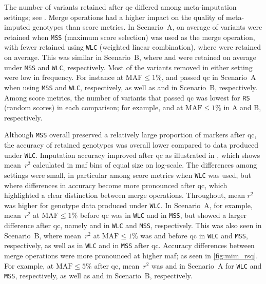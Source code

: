 %

%

The number of variants retained after \gls{qc} differed among meta-imputation settings; see .
Merge operations had a higher impact on the quality of meta-imputed genotypes than score metrics.
In Scenario~A, on average  of variants were retained when \texttt{MSS} (maximum score selection) was used as the merge operation, with fewer retained using \texttt{WLC} (weighted linear combination), where  were retained on average.
This was similar in Scenario~B, where  and 
were retained on average under \texttt{MSS} and \texttt{WLC}, respectively.
Most of the variants removed in either setting were low in frequency.
For instance at ${\text{MAF} \leq 1\%}$,
 and
 passed \gls{qc} in Scenario~A
when using \texttt{MSS} and \texttt{WLC}, respectively, as well as
 and
 in Scenario~B, respectively.
Among score metrics, the number of variants that passed \gls{qc} was lowest for \texttt{RS} (random scores) in each comparison; for example,  and  at ${\text{MAF} \leq 1\%}$ in A and B, respectively.

%

%

Although \texttt{MSS} overall preserved a relatively large proportion of markers after \gls{qc}, the accuracy of retained genotypes was overall lower compared to data produced under \texttt{WLC}.
Imputation accuracy improved after \gls{qc} as illustrated in , which shows mean~$r^2$ calculated in \gls{maf} bins of equal size on log-scale.
The differences among settings were small, in particular among score metrics when \texttt{WLC} was used, but where differences in accuracy become more pronounced after \gls{qc}, which highlighted a clear distinction between merge operations.
Throughout, mean $r^2$ was higher for genotype data produced under \texttt{WLC}.
In Scenario~A, for example, mean~$r^2$ at ${\text{MAF} \leq 1\%}$ before \gls{qc} was
 in \texttt{WLC} and
 in \texttt{MSS}, but showed a larger difference after \gls{qc}, namely
 and
 in \texttt{WLC} and \texttt{MSS}, respectively.
This was also seen in Scenario~B,
where mean~$r^2$ at ${\text{MAF} \leq 1\%}$ was
 and
 before \gls{qc} in \texttt{WLC} and \texttt{MSS}, respectively, as well as
 in \texttt{WLC} and
 in \texttt{MSS} after \gls{qc}.
Accuracy differences between merge operations were more pronounced at higher \gls{maf}; as seen in \cref{fig:mim_rsq}.
For example, at ${\text{MAF} \leq 5\%}$ after \gls{qc}, mean~$r^2$ was
 and
in Scenario~A for \texttt{WLC} and \texttt{MSS}, respectively, as well as
 and
 in Scenario~B, respectively.

